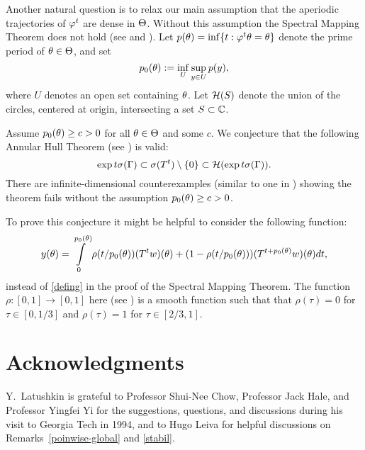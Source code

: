 \begin{rem}\label{Nonperiodic} Another natural question is to relax
our main assumption that the aperiodic trajectories of $\varphi^t$ are
dense in $\Theta$. Without this assumption the Spectral Mapping Theorem
does not hold (see \cite{CS} and \cite{LS}). Let $p(\theta)=\inf\{t:
\varphi^t\theta=\theta\}$ denote the prime period of $\theta\in \Theta$, and set
\[p_0(\theta):=\inf_{U} \sup_{y\in U} p(y),\]
 where $U$ denotes an open set containing $\theta$.
Let ${\cal{H}}(S)$ denote the union of the circles, centered at
origin, intersecting a set $S\subset{\Bbb{C}}$.

Assume $p_0(\theta)\geq c>0$ for all $\theta\in \Theta$ and some $c$. We conjecture
that the following Annular Hull Theorem (see \cite{CS}) is valid:
\[ \exp {t\sigma (\Gamma)} \subset \sigma(T^t)\setminus \{0\}
\subset {\cal{H}}(\exp {t\sigma (\Gamma)}).\]
There are infinite-dimensional counterexamples (similar to one in
\cite{Mont})
 showing the theorem
fails without the assumption $p_0(\theta)\geq c>0$.

To prove this conjecture it might be helpful to consider
the following function:
\[y(\theta)=\int\limits_0^{p_0(\theta)}\rho(t/p_0(\theta))(T^tw)(\theta)+
(1-\rho(t/p_0(\theta)))(T^{t+p_0(\theta)}w)(\theta) dt,\]
instead of \eqref{defing} in the proof of the Spectral Mapping
Theorem. The function $\rho:[0,1]\to [0,1]$ here (see \cite[p.~46]{LMS2}) is a
smooth function such that that $\rho(\tau)=0$ for $\tau\in [0,1/3]$ and
$\rho(\tau)=1$ for $\tau\in [2/3,1]$.
\end{rem}

\section{Acknowledgments}

Y.~Latushkin is grateful to Professor Shui-Nee Chow,
Professor Jack Hale, and Professor Yingfei Yi for
the  suggestions, questions, and discussions during
his visit to Georgia Tech in 1994, and to Hugo Leiva for
helpful discussions on Remarks~\ref{poinwise-global} and
\ref{stabil}.




